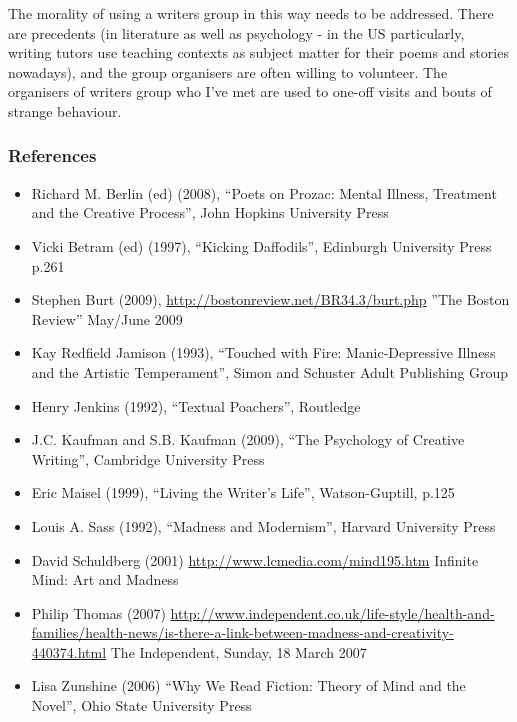 \documentclass[11pt]{article}
\begin{document}
 The morality of using a writers group in this way needs to be addressed. There are precedents (in
literature as well as psychology - in the US particularly, writing tutors use teaching contexts as subject matter for their poems and stories nowadays), and the group organisers are often willing to volunteer. The organisers of writers group who I've met are used to one-off visits and bouts of strange behaviour.

\subsubsection*{References}
\begin{itemize}
         \item  Richard M. Berlin (ed) (2008), ``Poets on Prozac: Mental Illness, Treatment and the Creative Process'', John Hopkins University Press
         \item  Vicki Betram (ed) (1997), ``Kicking Daffodils'', Edinburgh University Press p.261
         \item  Stephen Burt (2009),
    \url{http://bostonreview.net/BR34.3/burt.php} ''The Boston Review'' May/June 2009
         \item  Kay Redfield Jamison (1993), ``Touched with Fire: Manic-Depressive Illness and the Artistic Temperament'', Simon and Schuster Adult Publishing Group
        \item Henry Jenkins (1992), ``Textual Poachers'', Routledge
\item J.C. Kaufman and S.B. Kaufman (2009), ``The Psychology of Creative Writing'', Cambridge University Press
        \item Eric Maisel (1999), ``Living the Writer's Life'', Watson-Guptill, p.125
        \item Louis A. Sass (1992), ``Madness and Modernism'', Harvard University Press

        \item David Schuldberg (2001) \url{http://www.lcmedia.com/mind195.htm} Infinite Mind: Art and Madness
         \item  Philip Thomas (2007) \url{http://www.independent.co.uk/life-style/health-and-families/health-news/is-there-a-link-between-madness-and-creativity-440374.html} The Independent, Sunday, 18 March 2007
\item Lisa Zunshine (2006) ``Why We Read Fiction: Theory of Mind and the Novel'', Ohio State University Press 


\end{itemize}
\end{document}
